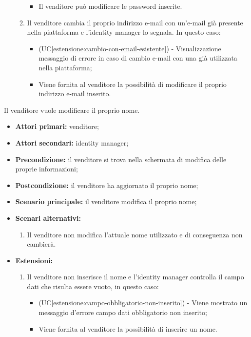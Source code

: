 \begin{itemize}
\begin{enumerate}[label=\lett]
\begin{itemize}
    		\item Il venditore può modificare le password inserite.
    	\end{itemize}
    	\item Il venditore cambia il proprio indirizzo e-mail con un'e-mail già presente nella piattaforma e l'identity manager lo segnala. In questo caso:
    	\begin{itemize}
    		\item (UC\ref{estensione:cambio-con-email-esistente}) - Visualizzazione messaggio di errore in caso di cambio e-mail con una già utilizzata nella piattaforma;
    		\item Viene fornita al venditore la possibilità di modificare il proprio indirizzo e-mail inserito.
    	\end{itemize}
    \end{enumerate}
\end{itemize}

\label{modifica-informazioni-venditore.nome}

Il venditore vuole modificare il proprio nome.
\begin{itemize}
	\item \textbf{Attori primari:} venditore;
	\item \textbf{Attori secondari:} identity manager;
	\item \textbf{Precondizione:} il venditore si trova nella schermata di modifica delle proprie informazioni;
	\item \textbf{Postcondizione:} il venditore ha aggiornato il proprio nome;
	\item \textbf{Scenario principale:} il venditore modifica il proprio nome;
	\item \textbf{Scenari alternativi:}
	\begin{enumerate}[label=\lett]
		\item Il venditore non modifica l'attuale nome utilizzato e di conseguenza non cambierà.
	\end{enumerate}
	\item \textbf{Estensioni:}
	\begin{enumerate}[label=\lett]
		\item Il venditore non inserisce il nome e l'identity manager controlla il campo dati che risulta essere vuoto, in questo caso:
		\begin{itemize}
			\item (UC\ref{estensione:campo-obbligatorio-non-inserito}) - Viene mostrato un messaggio d'errore campo dati obbligatorio non inserito;
			\item Viene fornita al venditore la possibilità di inserire un nome.
		\end{itemize}
	\end{enumerate} 
\end{itemize}

